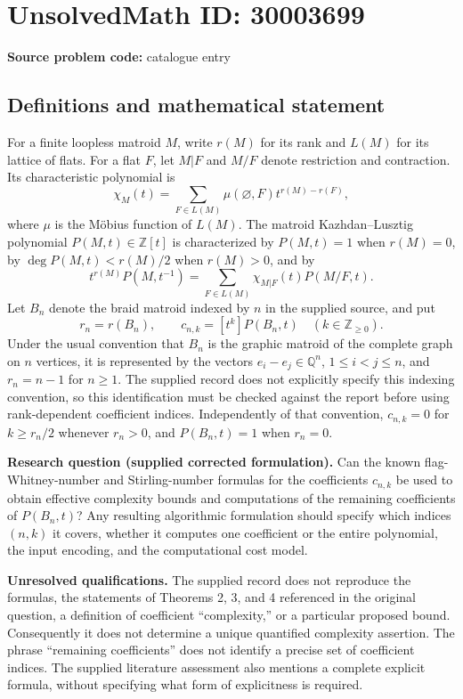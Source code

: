 \documentclass[11pt]{article}
\newcommand{\Z}{\mathbb{Z}}
\newcommand{\Q}{\mathbb{Q}}
\begin{document}
\section*{UnsolvedMath ID: 30003699}
\textbf{Source problem code:} catalogue entry
\subsection{Definitions and mathematical statement}
For a finite loopless matroid \(M\), write \(r(M)\) for its rank and \(L(M)\) for its lattice of flats. For a flat \(F\), let \(M|F\) and \(M/F\) denote restriction and contraction. Its characteristic polynomial is
\[
\chi_M(t)=\sum_{F\in L(M)}\mu(\varnothing,F)t^{r(M)-r(F)},
\]
where \(\mu\) is the Möbius function of \(L(M)\). The matroid Kazhdan--Lusztig polynomial \(P(M,t)\in\Z[t]\) is characterized by \(P(M,t)=1\) when \(r(M)=0\), by \(\deg P(M,t)<r(M)/2\) when \(r(M)>0\), and by
\[
t^{r(M)}P(M,t^{-1})
=\sum_{F\in L(M)}\chi_{M|F}(t)P(M/F,t).
\]
Let \(B_n\) denote the braid matroid indexed by \(n\) in the supplied source, and put
\[
r_n=r(B_n),\qquad c_{n,k}=[t^k]P(B_n,t)\quad(k\in\Z_{\geq0}).
\]
Under the usual convention that \(B_n\) is the graphic matroid of the complete graph on \(n\) vertices, it is represented by the vectors \(e_i-e_j\in\Q^n\), \(1\leq i<j\leq n\), and \(r_n=n-1\) for \(n\geq1\). The supplied record does not explicitly specify this indexing convention, so this identification must be checked against the report before using rank-dependent coefficient indices. Independently of that convention, \(c_{n,k}=0\) for \(k\geq r_n/2\) whenever \(r_n>0\), and \(P(B_n,t)=1\) when \(r_n=0\).

\textbf{Research question (supplied corrected formulation).} Can the known flag-Whitney-number and Stirling-number formulas for the coefficients \(c_{n,k}\) be used to obtain effective complexity bounds and computations of the remaining coefficients of \(P(B_n,t)\)? Any resulting algorithmic formulation should specify which indices \((n,k)\) it covers, whether it computes one coefficient or the entire polynomial, the input encoding, and the computational cost model.

\textbf{Unresolved qualifications.} The supplied record does not reproduce the formulas, the statements of Theorems 2, 3, and 4 referenced in the original question, a definition of coefficient ``complexity,'' or a particular proposed bound. Consequently it does not determine a unique quantified complexity assertion. The phrase ``remaining coefficients'' does not identify a precise set of coefficient indices. The supplied literature assessment also mentions a complete explicit formula, without specifying what form of explicitness is required.
\end{document}
